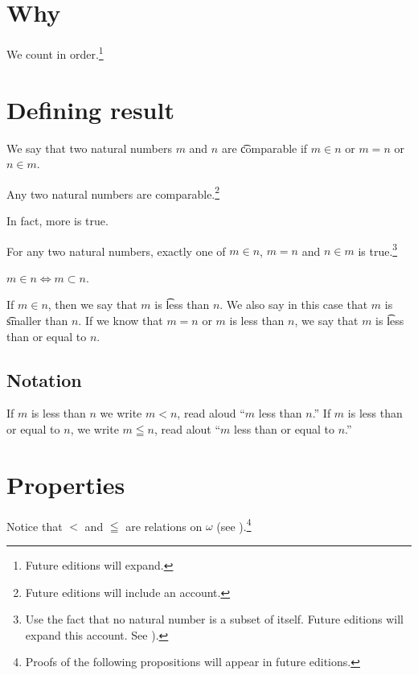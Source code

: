 
\section*{Why}

We count in order.\footnote{Future editions will expand.}

\section*{Defining result}

We say that two natural numbers $m$ and $n$ are \t{comparable} if $m \in n$ or $m = n$ or $n \in m$.

\begin{proposition}
Any two natural numbers are comparable.\footnote{Future editions will include an account.}
\end{proposition}

In fact, more is true.

\begin{proposition}
For any two natural numbers, exactly one of $m \in n$, $m = n$ and $n \in m$ is true.\footnote{Use the fact that no natural number is a subset of itself. Future editions will expand this account. See ).}
\end{proposition}

\begin{proposition}
$m \in n \iff m \subset n$.
\end{proposition}

If $m \in n$, then we say that $m$ is \t{less than} $n$.
We also say in this case that $m$ is \t{smaller than} $n$.
If we know that $m = n$ or $m$ is less than $n$, we say that $m$ is \t{less than or equal to} $n$.

\subsection*{Notation}

If $m$ is less than $n$ we write $m < n$, read aloud ``$m$ less than $n$.''
If $m$ is less than or equal to $n$, we write $m \leqq n$, read alout ``$m$ less than or equal to $n$.''

\section*{Properties}

Notice that $<$ and $\leqq$ are relations on $\omega $ (see ).\footnote{Proofs of the following propositions will appear in future editions.}

